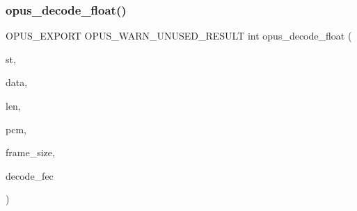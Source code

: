 \subsubsection{\texorpdfstring{opus\_decode\_float()}{opus\_decode\_float()}}
{\footnotesize\ttfamily O\+P\+U\+S\+\_\+\+E\+X\+P\+O\+RT O\+P\+U\+S\+\_\+\+W\+A\+R\+N\+\_\+\+U\+N\+U\+S\+E\+D\+\_\+\+R\+E\+S\+U\+LT int opus\+\_\+decode\+\_\+float (\begin{DoxyParamCaption}\item[{\mbox{\hyperlink{group__opus__decoder_ga401d8579958d36094715a6b90cd159a6}{Opus\+Decoder}} $\ast$}]{st,  }\item[{const unsigned char $\ast$}]{data,  }\item[{\mbox{\hyperlink{opus__types_8h_aa4d309d6f80b99dbabebc8f98879ab9a}{opus\+\_\+int32}}}]{len,  }\item[{float $\ast$}]{pcm,  }\item[{int}]{frame\+\_\+size,  }\item[{int}]{decode\+\_\+fec }\end{DoxyParamCaption})}

